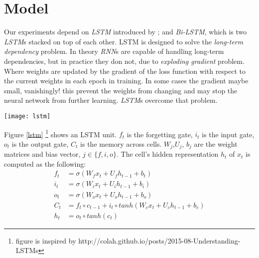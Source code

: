 \documentclass[12pt]{report}
\begin{document}
\section*{Model}
Our experiments depend on \textit{LSTM} introduced by \citet{Hochreiter1997}; and
\textit{Bi-LSTM}, which is two \textit{LSTM}s stacked on top of each other.  LSTM
is designed to solve the \textit{long-term dependency} problem.  In theory
\textit{RNN}s are capable of handling long-term dependencies, but in practice
they don not, due to \textit{exploding gradient} problem. Where weights are updated
by the gradient of the loss function with respect to the current weights in each
epoch in training. In some cases the gradient maybe small, vanishingly! this
prevent the weights from changing and may stop the neural network from further
learning. \textit{LSTM}s overcome that problem.

\begin{center}
\texttt{[image: lstm]}
\label{lstm}
\end{center}

Figure \ref{lstm} \footnote{figure is inspired by  http://colah.github.io/posts/2015-08-Understanding-LSTMs}
shows an LSTM unit. $f_t$ is the forgetting gate, $i_t$ is the input gate, $o_t$
is the output gate, $C_t$ is the memory across cells. %
$W_j$,$U_j$, $b_j$ are the weight matrices and bias vector, $j \in \{f, i, o\}$.
The cell's hidden representation $h_t$ of $x_t$ is computed as the following:%
\begin{align*}
  f_t  &= \sigma(W_f  x_t + U_f h_{t-1} + b_t)\\
  i_t  &= \sigma(W_i  x_t + U_i h_{t-1} + b_i)\\
  o_t  &= \sigma(W_o  x_t + U_o h_{t-1} + b_o)\\
  C_t  &= f_t \circ c_{t-1} + i_t \circ tanh(W_c x_t + U_c h_{t-1} + b_c)\\
  h_t  &= o_t \circ tanh(c_t)
\end{align*}
\end{document}
